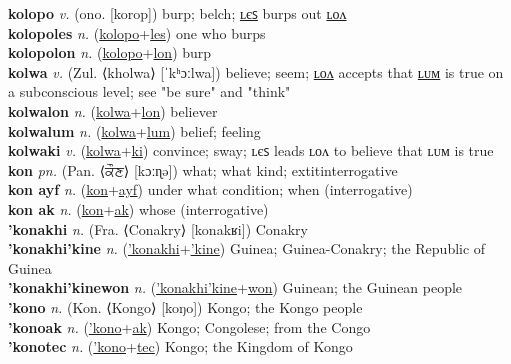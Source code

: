 \textbf{kolopo} \textit{v.} (ono. [korop])
burp; belch; \hyperref[kolopoles]{ʟєꜱ} burps out \hyperref[kolopolon]{ʟᴏᴧ} \label{kolopo} \\
\textbf{kolopoles} \textit{n.} (\hyperref[kolopo]{kolopo}+\hyperref[les]{les})
one who burps \label{kolopoles} \\
\textbf{kolopolon} \textit{n.} (\hyperref[kolopo]{kolopo}+\hyperref[lon]{lon})
burp \label{kolopolon} \\
\textbf{kolwa} \textit{v.} (Zul. ⟨kholwa⟩ [ˈkʰɔːlwa])
believe; seem; \hyperref[kolwalon]{ʟᴏᴧ} accepts that \hyperref[kolwalum]{ʟᴜᴍ} is true on a subconscious level; see "be sure" and "think" \label{kolwa} \\
\textbf{kolwalon} \textit{n.} (\hyperref[kolwa]{kolwa}+\hyperref[lon]{lon})
believer \label{kolwalon} \\
\textbf{kolwalum} \textit{n.} (\hyperref[kolwa]{kolwa}+\hyperref[lum]{lum})
belief; feeling \label{kolwalum} \\
\textbf{kolwaki} \textit{v.} (\hyperref[kolwa]{kolwa}+\hyperref[ki]{ki})
convince; sway; ʟєꜱ leads ʟᴏᴧ to believe that ʟᴜᴍ is true \label{kolwaki} \\
\textbf{kon} \textit{pn.} (Pan. ⟨ਕੌਣ⟩ [kɔːɳə])
what; what kind; 	extit{interrogative} \label{kon} \\
\textbf{kon ayf} \textit{n.} (\hyperref[kon]{kon}+\hyperref[yf]{ayf})
under what condition; when (interrogative) \label{kon ayf} \\
\textbf{kon ak} \textit{n.} (\hyperref[kon]{kon}+\hyperref[k]{ak})
whose (interrogative) \label{kon ak} \\
\textbf{'konakhi} \textit{n.} (Fra. ⟨Conakry⟩ [konakʁi])
Conakry \label{'konakhi} \\
\textbf{'konakhi'kine} \textit{n.} (\hyperref['konakhi]{'konakhi}+\hyperref['kine]{'kine})
Guinea; Guinea-Conakry; the Republic of Guinea \label{'konakhi'kine} \\
\textbf{'konakhi'kinewon} \textit{n.} (\hyperref['konakhi'kine]{'konakhi'kine}+\hyperref[won]{won})
Guinean; the Guinean people \label{'konakhi'kinewon} \\
\textbf{'kono} \textit{n.} (Kon. ⟨Kongo⟩ [koŋo])
Kongo; the Kongo people \label{'kono} \\
\textbf{'konoak} \textit{n.} (\hyperref['kono]{'kono}+\hyperref[ak]{ak})
Kongo; Congolese; from the Congo \label{'konoak} \\
\textbf{'konotec} \textit{n.} (\hyperref['kono]{'kono}+\hyperref[tec]{tec})
Kongo; the Kingdom of Kongo \label{'konotec} \\
